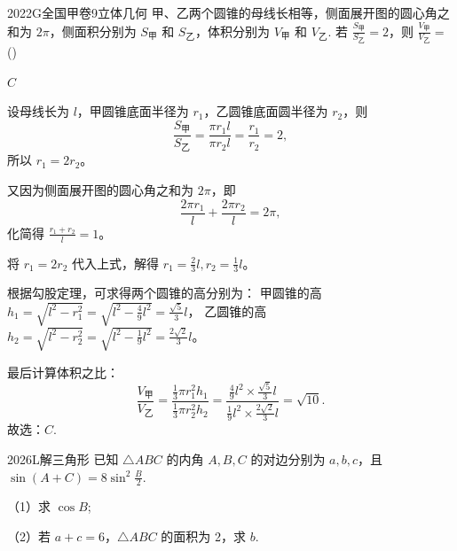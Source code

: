\documentclass[12pt,UTF-8,a4paper]{ctexart}
\numberwithin{figure}{section}
\theoremstyle{mystyle}
\theoremstyle{mystylekaishu}
\theoremstyle{mystyle}
\numberwithin{xiti}{section}
\begin{document}

\begin{problem}{2022}{G}{全国甲卷}{9}{立体几何}
甲、乙两个圆锥的母线长相等，侧面展开图的圆心角之和为 $2 \pi$，侧面积分别为 $S_{\text{甲}}$ 和 $S_{\text{乙}}$，体积分别为 $V_{\text{甲}}$ 和 $V_{\text{乙}}$. 若 $\frac{S_{\text{甲}}}{S_{\text{乙}}}=2$，则 $\frac{V_{\text{甲}}}{V_{\text{乙}}}=$ (\hspace{1cm})
\begin{choices}
\end{choices}
\end{problem}

\begin{answer}
$C$
\end{answer}

\begin{solutions}
设母线长为 $l$，甲圆锥底面半径为 $r_1$，乙圆锥底面圆半径为 $r_2$，则
$$
\frac{S_{\text{甲}}}{S_{\text{乙}}} = \frac{\pi r_1 l}{\pi r_2 l} = \frac{r_1}{r_2} = 2,
$$
所以 $r_1 = 2r_2$。

又因为侧面展开图的圆心角之和为 $2 \pi$，即
$$
\frac{2\pi r_1}{l} + \frac{2\pi r_2}{l} = 2\pi,
$$
化简得 $\frac{r_1 + r_2}{l} = 1$。

将 $r_1 = 2r_2$ 代入上式，解得 $r_1 = \frac{2}{3}l, r_2 = \frac{1}{3}l$。

根据勾股定理，可求得两个圆锥的高分别为：
甲圆锥的高 $h_1 = \sqrt{l^2 - r_1^2} = \sqrt{l^2 - \frac{4}{9}l^2} = \frac{\sqrt{5}}{3}l$，
乙圆锥的高 $h_2 = \sqrt{l^2 - r_2^2} = \sqrt{l^2 - \frac{1}{9}l^2} = \frac{2\sqrt{2}}{3}l$。

最后计算体积之比：
$$
\frac{V_{\text{甲}}}{V_{\text{乙}}} = \frac{\frac{1}{3}\pi r_1^2 h_1}{\frac{1}{3}\pi r_2^2 h_2} = \frac{\frac{4}{9}l^2 \times \frac{\sqrt{5}}{3}l}{\frac{1}{9}l^2 \times \frac{2\sqrt{2}}{3}l} = \sqrt{10}.
$$
故选：$C$.
\end{solutions}


\begin{problem}{2026}{L}{}{}{解三角形}
已知 $\triangle ABC$ 的内角 $A, B, C$ 的对边分别为 $a, b, c$，且 $\sin(A+C)=8\sin^2\frac{B}{2}$.

（1）求 $\cos B$;

（2）若 $a+c=6$，$\triangle ABC$ 的面积为 2，求 $b$.
\end{problem}
\end{document}
